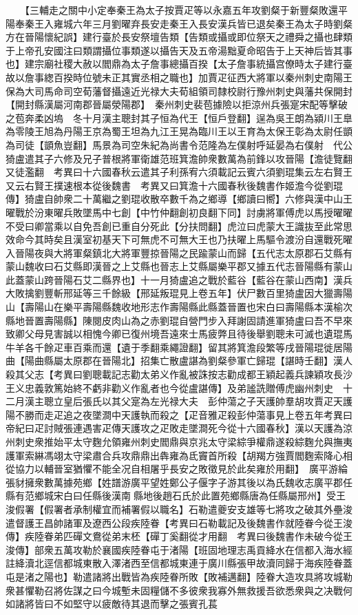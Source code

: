 　　【三輔走之關中小定奉秦王為太子按賈疋等以永嘉五年攻劉粲于新豐粲敗還平陽奉秦王入雍城六年三月劉曜弃長安走秦王入長安漢兵皆已退矣秦王為太子時劉粲方在晉陽懷紀誤】建行臺於長安祭壇告類【告類或攝或即位祭天之禮舜之攝也肆類于上帝孔安國注曰類謂攝位事類遂以攝告天及五帝湯黜夏命昭告于上天神后皆其事也】建宗廟社稷大赦以閻鼎為太子詹事總攝百揆【太子詹事統攝宫僚時太子建行臺故以詹事緫百揆時位號未正其實丞相之職也】加賈疋征西大將軍以秦州刺史南陽王保為大司馬命司空荀藩督攝遠近光禄大夫荀組領司隸校尉行豫州刺史與藩共保開封【開封縣漢屬河南郡晉屬滎陽郡】　秦州刺史裴苞據險以拒涼州兵張寔宋配等擊破之苞奔柔凶塢　冬十月漢主聰封其子恒為代王【恒戶登翻】逞為吳王朗為潁川王臯為零陵王旭為丹陽王京為蜀王坦為九江王晃為臨川王以王育為太保王彰為太尉任顗為司徒【顗魚豈翻】馬景為司空朱紀為尚書令范隆為左僕射呼延晏為右僕射　代公猗盧遣其子六修及兄子普根將軍衛雄范班箕澹帥衆數萬為前鋒以攻晉陽【澹徒覽翻又徒濫翻　考異曰十六國春秋云遣其子利孫宥六須載記云賓六須劉琨集云左右賢王又云右賢王撲速根本從後魏書　考異又曰箕澹十六國春秋後魏書作姬澹今從劉琨傳】猗盧自帥衆二十萬繼之劉琨收散卒數千為之鄉導【鄉讀曰嚮】六修與漢中山王曜戰於汾東曜兵敗墜馬中七創【中竹仲翻創初良翻下同】討虜將軍傅虎以馬授曜曜不受曰卿當乘以自免吾創已重自分死此【分扶問翻】虎泣曰虎蒙大王識抜至此常思效命今其時矣且漢室初基天下可無虎不可無大王也乃扶曜上馬驅令渡汾自還戰死曜入晉陽夜與大將軍粲鎮北大將軍豐掠晉陽之民踰蒙山而歸【五代志太原郡石艾縣有蒙山魏收曰石艾縣即漢晉之上艾縣也晉志上艾縣屬樂平郡又據五代志晉陽縣有蒙山此蓋蒙山跨晉陽石艾二縣界也】十一月猗盧追之戰於藍谷【藍谷在蒙山西南】漢兵大敗擒劉豐斬邢延等三千餘級【邢延叛琨見上卷五年】伏尸數百里猗盧因大獵壽陽山【壽陽山在樂平壽陽縣魏收地形志作壽陽縣此縣蓋晉置也宋白曰壽陽縣本漢榆次縣地晉置壽陽縣】陳閱皮肉山為之赤劉琨自營門步入拜謝固請進軍猗盧曰吾不早來致卿父母見害誠以相愧今卿已復州境吾遠來士馬疲弊且待後舉劉聰未可滅也遺琨馬牛羊各千餘疋車百乘而還【遺于季翻乘繩證翻】留其將箕澹段繁等戌晉陽琨徙居陽曲【陽曲縣屬太原郡在晉陽北】招集亡散盧諶為劉粲參軍亡歸琨【諶時壬翻】漢人殺其父志【考異曰劉聰載記志勸太弟义作亂被誅按志勸成都王穎起義兵諫穎攻長沙王义忠義敦篤始終不虧非勸义作亂者也今從盧諶傳】及弟謐詵贈傅虎幽州刺史　十二月漢主聰立皇后張氏以其父寔為左光禄大夫　彭仲蕩之子天護帥羣胡攻賈疋天護陽不勝而走疋追之夜墜澗中天護執而殺之【疋音雅疋殺彭仲蕩事見上卷五年考異曰帝紀曰疋討賊張連遇害疋傳天護攻之疋敗走墜澗死今從十六國春秋】漢以天護為涼州刺史衆推始平太守麴允領雍州刺史閻鼎與京兆太守梁綜爭權鼎遂殺綜麴允與撫夷護軍索綝馮翊太守梁肅合兵攻鼎鼎出犇雍為氐竇首所殺【胡羯方強賈閻麴索降心相從協力以輔晉室猶懼不能全况自相屠乎長安之敗徵見於此矣雍於用翻】　廣平游綸張豺擁衆數萬據苑鄉【姓譜游廣平望姓鄭公子偃字子游其後以為氏魏收志廣平郡任縣有范鄉城宋白曰任縣後漢南縣地後趙石氏於此置苑鄉縣唐為任縣屬邢州】受王浚假署【假署者承制權宜而補署假以職名】石勒遣夔安支雄等七將攻之破其外壘浚遣督護王昌帥諸軍及遼西公段疾陸眷【考異曰石勒載記及後魏書作就陸眷今從王浚傳】疾陸眷弟匹磾文鴦從弟末柸【磾丁奚翻從才用翻　考異曰後魏書作未破今從王浚傳】部衆五萬攻勒於襄國疾陸眷屯于渚陽【班固地理志禹貢絳水在信都入海水經註絳瀆北逕信都城東散入澤渚西至信都城東連于廣川縣張甲故瀆同歸于海疾陸眷蓋屯是渚之陽也】勒遣諸將出戰皆為疾陸眷所敗【敗補邁翻】陸眷大造攻具將攻城勒衆甚懼勒召將佐謀之曰今城塹未固糧儲不多彼衆我寡外無救援吾欲悉衆與之决戰何如諸將皆曰不如堅守以疲敵待其退而擊之張賓孔萇